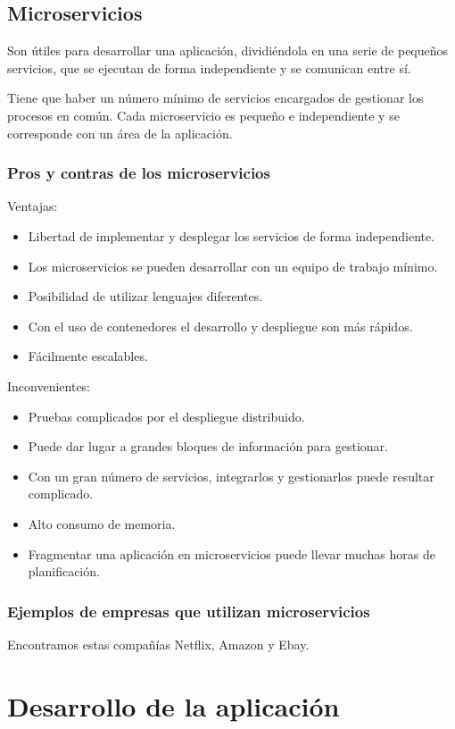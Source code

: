 \documentclass[12pt]{report} %
\begin{document}
\section{Microservicios}

Son útiles para desarrollar una aplicación, dividiéndola en una serie de pequeños servicios, que se ejecutan de forma independiente y se comunican entre sí.

Tiene que haber un número mínimo de servicios encargados de gestionar los procesos en común. Cada microservicio es pequeño e independiente y se corresponde con un área de la aplicación. 

\subsection{Pros y contras de los microservicios}
Ventajas:
\begin{itemize}
	\item Libertad de implementar y desplegar los servicios de forma independiente.
	\item Los microservicios se pueden desarrollar con un equipo de trabajo mínimo.
	\item Posibilidad de utilizar lenguajes diferentes.
	\item Con el uso de contenedores el desarrollo y despliegue son más rápidos.
	\item Fácilmente escalables.
\end{itemize}
Inconvenientes:
\begin{itemize}
	\item Pruebas complicados por el despliegue distribuido.
	\item Puede dar lugar a grandes bloques de información para gestionar.
	\item Con un gran número de servicios, integrarlos y gestionarlos puede resultar complicado.
	\item Alto consumo de memoria.
	\item Fragmentar una aplicación en microservicios puede llevar muchas horas de planificación.
\end{itemize}

\subsection{Ejemplos de empresas que utilizan microservicios}


Encontramos estas compañías Netflix, Amazon y Ebay.


\chapter{Desarrollo de la aplicación}
\end{document}
